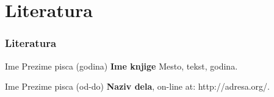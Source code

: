 \documentclass{beamer}
\begin{document}

\section{Literatura}

\begin{frame}
\frametitle{Literatura}
\footnotesize{
\begin{thebibliography}{99}

 Ime Prezime pisca (godina)
\newblock \small{\textbf{Ime knjige} Mesto, tekst, godina.}

 Ime Prezime pisca (od-do)
\newblock \small{\textbf{Naziv dela}, on-line at: http://adresa.org/.}

\end{thebibliography}
}

\end{frame}

\end{document}
